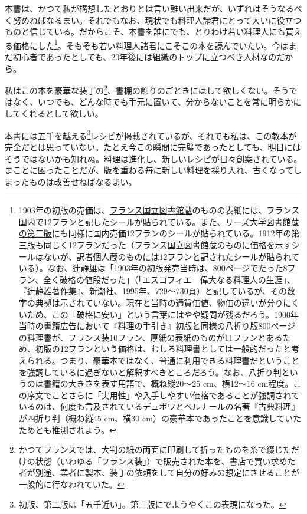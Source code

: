 \begin{main}
本書は、かつて私が構想したとおりとは言い難い出来だが、いずれはそうなるべく努めねばなるまい。それでもなお、現状でも料理人諸君にとって大いに役立つものと信じている。だからこそ、本書を誰にでも、とりわけ若い料理人にも買える価格にした\footnote{1903年の初版の売価は、\href{http://gallica.bnf.fr/ark:/12148/bpt6k65768837}{フランス国立図書館蔵}のものの表紙には、フランス国内で12フランと記したシールが貼られている。また、\href{https://archive.org/details/b21525912}{リーズ大学図書館蔵の第二版}にも同様に国内売価12フランのシールが貼られている。1912年の第三版も同じく12フランだった（\href{http://gallica.bnf.fr/ark:/12148/bpt6k96923116}{フランス国立図書館蔵}のものに価格を示すシールはないが、訳者個人蔵のものには12フランと記されたシールが貼られている）。なお、辻静雄は「1903年の初版発売当時は、800ページでたった8フラン、全く破格の値段だった」（「エスコフィエ　偉大なる料理人の生涯」、『辻静雄著作集』、新潮社、1995年、729〜730頁）と記しているが、その数字の典拠は示されていない。現在と当時の通貨価値、物価の違いが分りにくいため、この「破格に安い」という言葉にはやや疑問が残るだろう。1900年当時の書籍広告において『料理の手引き』初版と同様の八折り版800ページの料理書が、フランス装10フラン、厚紙の表紙のものが11フランとあるため、初版の12フランという価格は、むしろ料理書としては一般的だったと考えられる。つまり、豪華本ではなく、普通に利用できる料理書だということを強調しているに過ぎないと解釈すべきところだろう。なお、八折り判というのは書籍の大きさを表す用語で、概ね縦20〜25
  cm、横12〜16
  cm程度。この序文でことさらに「実用性」や入手しやすい価格であることが強調されているのは、何度も言及されているデュボワとベルナールの名著『古典料理』が四折り判（概ね縦45
  cm、横30 cm）の豪華本であったことを意識していたためとも推測されよう。}。そもそも若い料理人諸君にこそこの本を読んでいたい。今はまだ初心者であったとしても、20年後には組織のトップに立つべき人材なのだから。

私はこの本を豪華な装丁の\footnote{かつてフランスでは、大判の紙の両面に印刷して折ったものを糸で綴じただけの状態（いわゆる「フランス装」）で販売された本を、書店で買い求めた者が別途、業者に製本、装丁の依頼をして自分の好みの想定にさせることが一般的に行なわれていた。}、書棚の飾りのごときにはして欲しくない。そうではなく、いつでも、どんな時でも手元に置いて、分からないことを常に明らかにしてくれるとして欲しい。

本書には五千を越える\footnote{初版、第二版は「五千近い」。第三版にでようやくこの表現になった。}レシピが掲載されているが、それでも私は、この教本が完全だとは思っていない。たとえ今この瞬間に完璧であったとしても、明日にはそうではないかも知れぬ。料理は進化し、新しいレシピが日々創案されている。まことに困ったことだが、版を重ねる毎に新しい料理を採り入れ、古くなってしまったものは改善せねばなるまい。


\end{main}
